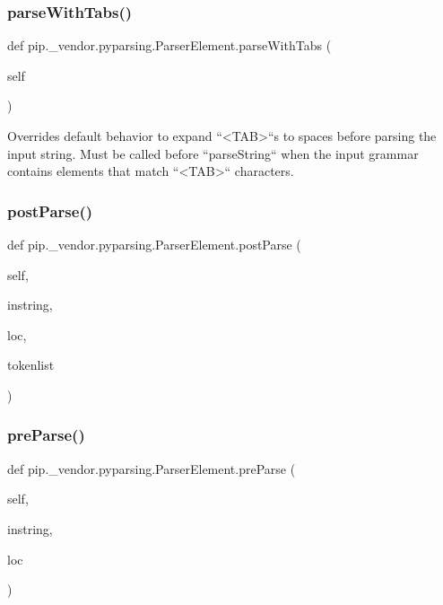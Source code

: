 \subsubsection{\texorpdfstring{parse\+With\+Tabs()}{parseWithTabs()}}
{\footnotesize\ttfamily def pip.\+\_\+vendor.\+pyparsing.\+Parser\+Element.\+parse\+With\+Tabs (\begin{DoxyParamCaption}\item[{}]{self }\end{DoxyParamCaption})}

\begin{DoxyVerb}Overrides default behavior to expand ``<TAB>``s to spaces before parsing the input string.
Must be called before ``parseString`` when the input grammar contains elements that
match ``<TAB>`` characters.
\end{DoxyVerb}
 \mbox{\label{classpip_1_1__vendor_1_1pyparsing_1_1ParserElement_a3dd7af04f05341b7bdb3d045ed25094a}} 
\subsubsection{\texorpdfstring{post\+Parse()}{postParse()}}
{\footnotesize\ttfamily def pip.\+\_\+vendor.\+pyparsing.\+Parser\+Element.\+post\+Parse (\begin{DoxyParamCaption}\item[{}]{self,  }\item[{}]{instring,  }\item[{}]{loc,  }\item[{}]{tokenlist }\end{DoxyParamCaption})}

\mbox{\label{classpip_1_1__vendor_1_1pyparsing_1_1ParserElement_a34d0267785f41e654e901648baab7649}} 
\subsubsection{\texorpdfstring{pre\+Parse()}{preParse()}}
{\footnotesize\ttfamily def pip.\+\_\+vendor.\+pyparsing.\+Parser\+Element.\+pre\+Parse (\begin{DoxyParamCaption}\item[{}]{self,  }\item[{}]{instring,  }\item[{}]{loc }\end{DoxyParamCaption})}

